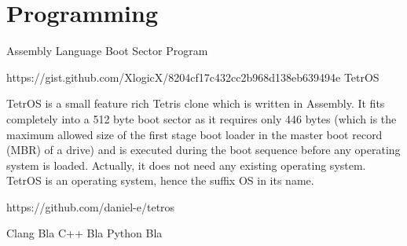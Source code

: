 \chapter{Programming}

Assembly Language
Boot Sector Program

https://gist.github.com/XlogicX/8204cf17c432cc2b968d138eb639494e
TetrOS

TetrOS is a small feature rich Tetris clone which is written in Assembly. It fits completely into a 512 byte boot sector as it requires only 446 bytes (which is the maximum allowed size of the first stage boot loader in the master boot record (MBR) of a drive) and is executed during the boot sequence before any operating system is loaded. Actually, it does not need any existing operating system. TetrOS is an operating system, hence the suffix OS in its name.

https://github.com/daniel-e/tetros


Clang
Bla
C++
Bla
Python
Bla
